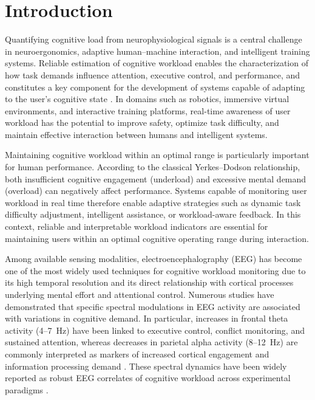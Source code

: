 \documentclass[10pt]{iopart}
\begin{document}

\ioptwocol

\maketitle


\section{Introduction}

Quantifying cognitive load from neurophysiological signals is a central challenge in neuroergonomics, adaptive human--machine interaction, and intelligent training systems. Reliable estimation of cognitive workload enables the characterization of how task demands influence attention, executive control, and performance, and constitutes a key component for the development of systems capable of adapting to the user’s cognitive state \cite{24}. In domains such as robotics, immersive virtual environments, and interactive training platforms, real-time awareness of user workload has the potential to improve safety, optimize task difficulty, and maintain effective interaction between humans and intelligent systems.

Maintaining cognitive workload within an optimal range is particularly important for human performance. According to the classical Yerkes--Dodson relationship, both insufficient cognitive engagement (underload) and excessive mental demand (overload) can negatively affect performance. Systems capable of monitoring user workload in real time therefore enable adaptive strategies such as dynamic task difficulty adjustment, intelligent assistance, or workload-aware feedback. In this context, reliable and interpretable workload indicators are essential for maintaining users within an optimal cognitive operating range during interaction.

Among available sensing modalities, electroencephalography (EEG) has become one of the most widely used techniques for cognitive workload monitoring due to its high temporal resolution and its direct relationship with cortical processes underlying mental effort and attentional control. Numerous studies have demonstrated that specific spectral modulations in EEG activity are associated with variations in cognitive demand. In particular, increases in frontal theta activity (4--7~Hz) have been linked to executive control, conflict monitoring, and sustained attention, whereas decreases in parietal alpha activity (8--12~Hz) are commonly interpreted as markers of increased cortical engagement and information processing demand \cite{c8}. These spectral dynamics have been widely reported as robust EEG correlates of cognitive workload across experimental paradigms \cite{c1,c4}.
\end{document}
